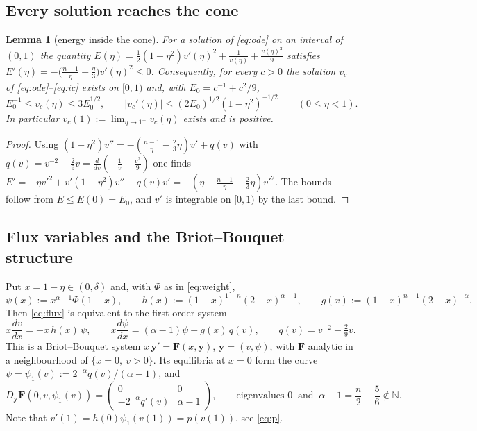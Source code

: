 \documentclass[11pt,a4paper]{amsart}
\newtheorem{lemma}[theorem]{Lemma}
\theoremstyle{definition}
\theoremstyle{remark}
\newcommand{\N}{\mathbb{N}}
\begin{document}
\subsection{Every solution reaches the cone}
\begin{lemma}[energy inside the cone]\label{lem:energy}
For a solution of \eqref{eq:ode} on an interval of $(0,1)$ the quantity
$E(\eta)=\frac12(1-\eta^2)v'(\eta)^2+\frac1{v(\eta)}+\frac{v(\eta)^2}9$
satisfies $E'(\eta)=-\big(\frac{n-1}{\eta}+\frac{\eta}3\big)v'(\eta)^2\le0$.  Consequently, for every $c>0$ the solution $v_c$ of \eqref{eq:ode}--\eqref{eq:ic} exists on $[0,1)$ and, with $E_0=c^{-1}+c^2/9$,
\begin{equation}\label{eq:apriori}
E_0^{-1}\le v_c(\eta)\le 3E_0^{1/2},\qquad |v_c'(\eta)|\le (2E_0)^{1/2}(1-\eta^2)^{-1/2}\qquad(0\le\eta<1).
\end{equation}
In particular $v_c(1):=\lim_{\eta\to1^-}v_c(\eta)$ exists and is positive.
\end{lemma}
\begin{proof}
Using $(1-\eta^2)v''=-(\frac{n-1}\eta-\frac23\eta)v'+q(v)$ with $q(v)=v^{-2}-\frac29v=\frac{d}{dv}(-\frac1v-\frac{v^2}9)$ one finds $E'=-\eta v'^2+v'(1-\eta^2)v''-q(v)v'=-(\eta+\frac{n-1}\eta-\frac23\eta)v'^2$.  The bounds follow from $E\le E(0)=E_0$, and $v'$ is integrable on $[0,1)$ by the last bound.
\end{proof}

\subsection{Flux variables and the Briot--Bouquet structure}
Put $x=1-\eta\in(0,\delta)$ and, with $\Phi$ as in \eqref{eq:weight},
\begin{equation}\label{eq:psi}
\psi(x):=x^{\alpha-1}\Phi(1-x),\qquad h(x):=(1-x)^{1-n}(2-x)^{\alpha-1},\qquad g(x):=(1-x)^{n-1}(2-x)^{-\alpha}.
\end{equation}
Then \eqref{eq:flux} is equivalent to the first-order system
\begin{equation}\label{eq:BB}
x\frac{dv}{dx}=-x\,h(x)\,\psi,\qquad x\frac{d\psi}{dx}=(\alpha-1)\psi-g(x)\,q(v),\qquad q(v)=v^{-2}-\tfrac29v .
\end{equation}
This is a Briot--Bouquet system $x\,\mathbf y'=\mathbf F(x,\mathbf y)$, $\mathbf y=(v,\psi)$, with $\mathbf F$ analytic in a neighbourhood of $\{x=0,\ v>0\}$.  Its equilibria at $x=0$ form the curve $\psi=\psi_1(v):=2^{-\alpha}q(v)/(\alpha-1)$, and
\[
D_{\mathbf y}\mathbf F(0,v,\psi_1(v))=\begin{pmatrix}0&0\\ -2^{-\alpha}q'(v)&\alpha-1\end{pmatrix},\qquad \text{eigenvalues }0\ \text{ and }\ \alpha-1=\frac n2-\frac56\notin\N .
\]
Note that $v'(1)=h(0)\psi_1(v(1))=p(v(1))$, see \eqref{eq:p}.
\end{document}
